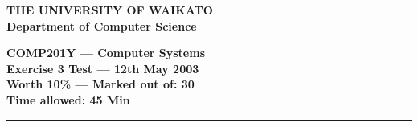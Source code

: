 \documentclass[a4paper,10pt]{article}
\begin{document}
\newcommand{\marks}[1]
{\begin{flushright}{\bf (#1 marks)}\end{flushright}}

{\centering \large \bf THE UNIVERSITY OF WAIKATO\\}
{\centering \large \bf Department of Computer Science\\[0.5cm]}

{\centering \large \bf COMP201Y ---  Computer Systems\\}
{\centering \large \bf Exercise 3 Test --- 12th May 2003\\[0.3cm]}
{\centering \bf Worth 10\% --- Marked out of: 30\\[0.3cm]}
{\centering \bf Time allowed: 45 Min\\[1cm]}
\hrule
\end{document}
